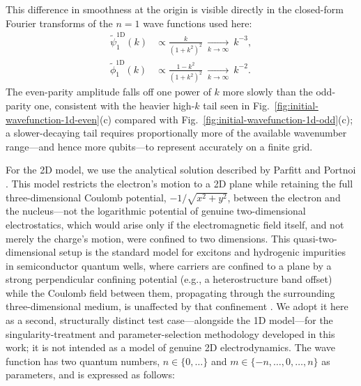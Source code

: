 \documentclass[manuscript_main.tex]{subfiles}
\begin{document}
This difference in smoothness at the origin is visible directly in the
closed-form Fourier transforms of the $n=1$ wave functions used here:
\begin{align}
\tilde\psi_1^{\mathrm{1D}}(k) &\propto \frac{k}{(1+k^2)^2}
\ \xrightarrow[k\to\infty]{}\ k^{-3},\\
\tilde\phi_1^{\mathrm{1D}}(k) &\propto \frac{1-k^2}{(1+k^2)^2}
\ \xrightarrow[k\to\infty]{}\ k^{-2}.
\end{align}
The even-parity amplitude falls off one power of $k$ more slowly than the
odd-parity one, consistent with the heavier high-$k$ tail seen in
Fig.~\ref{fig:initial-wavefunction-1d-even}(c) compared with
Fig.~\ref{fig:initial-wavefunction-1d-odd}(c); a slower-decaying tail
requires proportionally more of the available wavenumber range---and hence
more qubits---to represent accurately on a finite grid.

For the 2D model, we use the analytical solution described by Parfitt and
Portnoi \cite{Parfitt2002.10.1063/1.1503868}. This model restricts the
electron's motion to a 2D plane while retaining the full three-dimensional
Coulomb potential, $-1/\sqrt{x^2+y^2}$, between the electron and the
nucleus---not the logarithmic potential of genuine two-dimensional
electrostatics, which would arise only if the electromagnetic field
itself, and not merely the charge's motion, were confined to two
dimensions. This quasi-two-dimensional setup is the standard model for
excitons and hydrogenic impurities in semiconductor quantum wells, where
carriers are confined to a plane by a strong perpendicular confining
potential (e.g., a heterostructure band offset) while the Coulomb field
between them, propagating through the surrounding three-dimensional
medium, is unaffected by that confinement \cite{Parfitt2002.10.1063/1.1503868}.
We adopt it here as a second, structurally distinct test case---alongside
the 1D model---for the singularity-treatment and parameter-selection
methodology developed in this work; it is not intended as a model of
genuine 2D electrodynamics. The wave function
has two quantum numbers, $n\in\{0,\ldots\}$ and $m\in\{-n,\ldots,0,\ldots,n\}$ as
parameters, and is expressed as follows:
\end{document}
